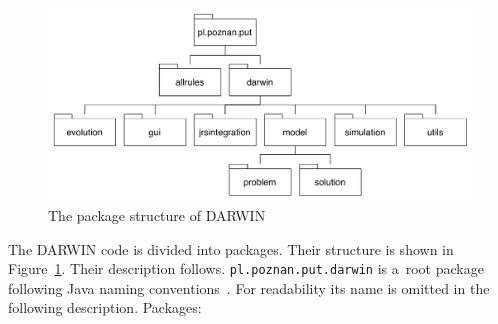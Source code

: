 \begin{figure}
  \centering \includegraphics[scale=0.45]{img/packages}
  \caption{The package structure of DARWIN}
  \label{packages}
\end{figure}

The DARWIN code is divided into packages. Their structure is shown in
Figure~\ref{packages}. Their description follows. \texttt{pl.poznan.put.darwin}
is a~root package following Java naming conventions~\cite{JCC}. For
readability its name is omitted in the following description. Packages:
